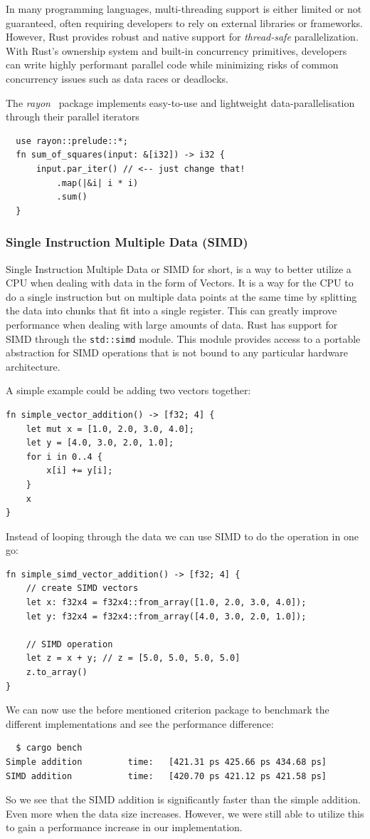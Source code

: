 \documentclass[twoside,11pt]{report}
\theoremstyle{definition}
\theoremstyle{plain}
\begin{document}
In many programming languages, multi-threading support is either limited or not guaranteed, often requiring developers to rely on external libraries or frameworks. However, Rust provides robust and native support for \textit{thread-safe} parallelization. With Rust's ownership system and built-in concurrency primitives, developers can write highly performant parallel code while minimizing risks of common concurrency issues such as data races or deadlocks.

The \textit{rayon}~\cite{rayon} package implements easy-to-use and lightweight data-parallelisation through their parallel iterators
\begin{verbatim}
  use rayon::prelude::*;
  fn sum_of_squares(input: &[i32]) -> i32 {
      input.par_iter() // <-- just change that!
          .map(|&i| i * i)
          .sum()
  }
\end{verbatim}

\subsubsection{Single Instruction Multiple Data (SIMD)}
Single Instruction Multiple Data or SIMD for short, is a way to better utilize a CPU when dealing with data in the form of Vectors. It is a way for the CPU to do a single instruction but on multiple data points at the same time by splitting the data into chunks that fit into a single register. This can greatly improve performance when dealing with large amounts of data. Rust has support for SIMD through the \texttt{std::simd} module. This module provides access to a portable abstraction for SIMD operations that is not bound to any particular hardware architecture.

A simple example could be adding two vectors together:
\begin{verbatim}
fn simple_vector_addition() -> [f32; 4] {
    let mut x = [1.0, 2.0, 3.0, 4.0];
    let y = [4.0, 3.0, 2.0, 1.0];
    for i in 0..4 {
        x[i] += y[i];
    }
    x
}

\end{verbatim}
Instead of looping through the data we can use SIMD to do the operation in one go:
\begin{verbatim}
fn simple_simd_vector_addition() -> [f32; 4] {
    // create SIMD vectors
    let x: f32x4 = f32x4::from_array([1.0, 2.0, 3.0, 4.0]);
    let y: f32x4 = f32x4::from_array([4.0, 3.0, 2.0, 1.0]);

    // SIMD operation
    let z = x + y; // z = [5.0, 5.0, 5.0, 5.0]
    z.to_array()
}
\end{verbatim}
We can now use the before mentioned criterion package to benchmark the different implementations and see the performance difference:
\begin{verbatim}
  $ cargo bench
Simple addition         time:   [421.31 ps 425.66 ps 434.68 ps]
SIMD addition           time:   [420.70 ps 421.12 ps 421.58 ps]
\end{verbatim}
So we see that the SIMD addition is significantly faster than the simple addition. Even more when the data size increases.
However, we were still able to utilize this to gain a performance increase in our implementation.
\end{document}
